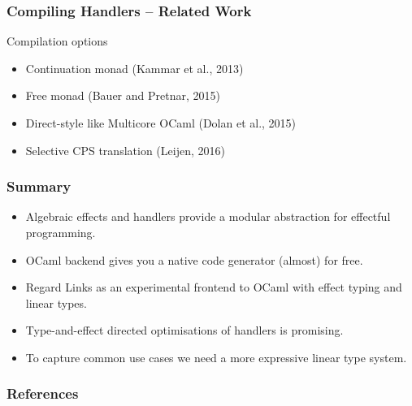 \documentclass[10pt,compress]{beamer}
\begin{document}
\begin{frame}
  \frametitle{Compiling Handlers -- Related Work}
Compilation options
\begin{itemize}
  \item Continuation monad (Kammar et al., 2013)
  \item Free monad (Bauer and Pretnar, 2015)
  \item Direct-style like Multicore OCaml (Dolan et al., 2015)
  \item Selective CPS translation (Leijen, 2016)
\end{itemize}
\end{frame}

\begin{frame}
  \frametitle{Summary}
\begin{itemize}
\item Algebraic effects and handlers provide a modular abstraction for
  effectful programming.
\item OCaml backend gives you a native code generator (almost) for free.
\item Regard Links as an experimental frontend to OCaml with effect
  typing and linear types.
\item Type-and-effect directed optimisations of handlers is promising.
  \item To capture common use cases we need a more expressive linear type system.
\end{itemize}
\end{frame}

%


\begin{frame}[allowframebreaks]
  \frametitle{References}
  \nocite{*}
  
\end{frame}
\end{document}
